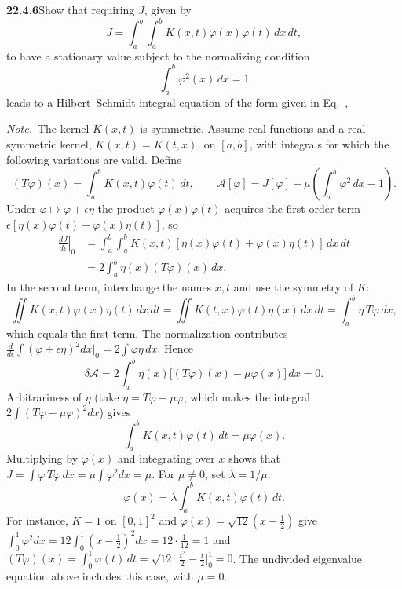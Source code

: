 \par\bigskip
\noindent\textbf{22.4.6}\quad Show that requiring $J$, given by
\[
J=\int_{a}^{b}\!\!\int_{a}^{b}
K(x,t)\varphi(x)\varphi(t)\,dx\,dt,
\]
to have a stationary value subject to the normalizing condition
\[
\int_{a}^{b}\varphi^{2}(x)\,dx=1
\]
leads to a Hilbert--Schmidt integral equation of the form given
in Eq.~, 
\par\emph{Note.}~The kernel $K(x,t)$ is symmetric.
\solution
Assume real functions and a real symmetric kernel,
$K(x,t)=K(t,x)$, on $[a,b]$, with integrals for which the following
variations are valid.  Define
\[
 (T\varphi)(x)=\int_a^bK(x,t)\varphi(t)\,dt,\qquad
 \mathcal A[\varphi]=J[\varphi]-\mu\left(\int_a^b\varphi^2\,dx-1\right).
\]
Under $\varphi\mapsto\varphi+\epsilon\eta$ the product
$\varphi(x)\varphi(t)$ acquires the first-order term
$\epsilon[\eta(x)\varphi(t)+\varphi(x)\eta(t)]$, so
\begin{align*}
 \left.\frac{dJ}{d\epsilon}\right|_0
 &=\int_a^b\int_a^bK(x,t)
       [\eta(x)\varphi(t)+\varphi(x)\eta(t)]\,dx\,dt\\
 &=2\int_a^b\eta(x)(T\varphi)(x)\,dx.
\end{align*}
In the second term, interchange the names $x,t$ and use the symmetry
of $K$:
\[
\iint K(x,t)\varphi(x)\eta(t)\,dx\,dt
=\iint K(t,x)\varphi(t)\eta(x)\,dx\,dt
=\int_a^b\eta\,T\varphi\,dx,
\]
which equals the first term.
The normalization contributes
$\frac{d}{d\epsilon}\int(\varphi+\epsilon\eta)^2dx\big|_0
=2\int\varphi\eta\,dx$.  Hence
\[
 \delta\mathcal A
 =2\int_a^b\eta(x)\bigl[(T\varphi)(x)-\mu\varphi(x)\bigr]\,dx=0.
\]
Arbitrariness of $\eta$ (take $\eta=T\varphi-\mu\varphi$, which makes
the integral $2\int(T\varphi-\mu\varphi)^2dx$) gives
\[
 \boxed{\int_a^bK(x,t)\varphi(t)\,dt=\mu\varphi(x)}.
\]
Multiplying by $\varphi(x)$ and integrating over $x$ shows that
$J=\int\varphi\,T\varphi\,dx=\mu\int\varphi^2dx=\mu$.  For $\mu\ne0$,
set $\lambda=1/\mu$:
\[
 \boxed{\varphi(x)=\lambda\int_a^bK(x,t)\varphi(t)\,dt}.
\]
For instance, $K=1$ on $[0,1]^2$ and
$\varphi(x)=\sqrt{12}(x-\tfrac12)$ give
$\int_0^1\varphi^2dx=12\int_0^1(x-\tfrac12)^2dx=12\cdot\tfrac1{12}=1$
and $(T\varphi)(x)=\int_0^1\varphi(t)\,dt
=\sqrt{12}\,\bigl[\tfrac{t^2}2-\tfrac t2\bigr]_0^1=0$.  The undivided
eigenvalue equation above includes this case, with $\mu=0$.


